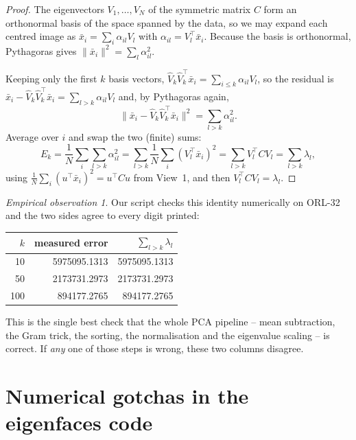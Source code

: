 \documentclass[11pt]{article}
\theoremstyle{definition}
\theoremstyle{remark}
\newtheorem*{observation}{Empirical observation}
\begin{document}
\begin{proof}
The eigenvectors $V_1,\dots,V_N$ of the symmetric matrix $C$ form an orthonormal
basis of the space spanned by the data, so we may expand each centred image as
$\bar{x}_i=\sum_{i} \alpha_{il}V_l$ with $\alpha_{il}=V_l^{\!\top} \bar{x}_i$. Because the basis is
orthonormal, Pythagoras gives $\|\bar{x}_i\|^2=\sum_l \alpha_{il}^2$.

Keeping only the first $k$ basis vectors, $\hat{V}_k\hat{V}_k^{\!\top} \bar{x}_i = \sum_{i\le k}\alpha_{il}V_l$,
so the residual is $\bar{x}_i - \hat{V}_k\hat{V}_k^{\!\top} \bar{x}_i = \sum_{l>k}\alpha_{il}V_l$ and, by
Pythagoras again,
\[
  \bigl\|\bar{x}_i-\hat{V}_k\hat{V}_k^{\!\top} \bar{x}_i\bigr\|^2 = \sum_{l>k}\alpha_{il}^2 .
\]
Average over $i$ and swap the two (finite) sums:
\[
  E_k = \frac1N\sum_i\sum_{l>k}\alpha_{il}^2
      = \sum_{l>k}\frac1N\sum_i (V_l^{\!\top} \bar{x}_i)^2
      = \sum_{l>k} V_l^{\!\top} C V_l
      = \sum_{l>k} \lambda_l ,
\]
using $\frac1N\sum_i (u^{\!\top} \bar{x}_i)^2 = u^{\!\top} Cu$ from View~1, and then
$V_l^{\!\top} CV_l=\lambda_l$.
\end{proof}

\begin{observation}
Our script checks this identity numerically on ORL-32 and the two sides agree to
every digit printed:
\begin{center}
\begin{tabular}{rrr}
\toprule
$k$ & measured error & $\sum_{l>k}\lambda_l$ \\
\midrule
10  & 5975095.1313 & 5975095.1313 \\
50  & 2173731.2973 & 2173731.2973 \\
100 &  894177.2765 &  894177.2765 \\
\bottomrule
\end{tabular}
\end{center}
This is the single best check that the whole PCA pipeline -- mean subtraction, the
Gram trick, the sorting, the normalisation and the eigenvalue scaling -- is
correct. If \emph{any} one of those steps is wrong, these two columns disagree.
\end{observation}

\section{Numerical gotchas in the eigenfaces code}
\label{sec:scaling}
\end{document}

